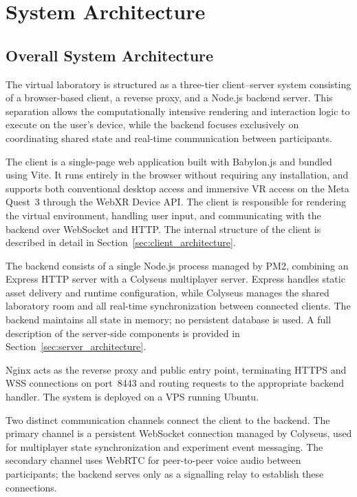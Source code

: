 \chapter{System Architecture}

\section{Overall System Architecture}
\label{sec:overall_architecture}

The virtual laboratory is structured as a three-tier client--server system
consisting of a browser-based client, a reverse proxy, and a Node.js backend
server. This separation allows the computationally intensive rendering and
interaction logic to execute on the user's device, while the backend focuses
exclusively on coordinating shared state and real-time communication between
participants.

The client is a single-page web application built with Babylon.js and bundled
using Vite. It runs entirely in the browser without requiring any installation,
and supports both conventional desktop access and immersive VR access on the
Meta Quest~3 through the WebXR Device API. The client is responsible for
rendering the virtual environment, handling user input, and communicating with
the backend over WebSocket and HTTP. The internal structure of the client is
described in detail in Section~\ref{sec:client_architecture}.

The backend consists of a single Node.js process managed by PM2, combining an
Express HTTP server with a Colyseus multiplayer server. Express handles static
asset delivery and runtime configuration, while Colyseus manages the shared
laboratory room and all real-time synchronization between connected clients.
The backend maintains all state in memory; no persistent database is used. A
full description of the server-side components is provided in
Section~\ref{sec:server_architecture}.

Nginx acts as the reverse proxy and public entry point, terminating HTTPS and
WSS connections on port~8443 and routing requests to the appropriate backend
handler. The system is deployed on a VPS running Ubuntu.

Two distinct communication channels connect the client to the backend. The
primary channel is a persistent WebSocket connection managed by Colyseus,
used for multiplayer state synchronization and experiment event messaging.
The secondary channel uses WebRTC for peer-to-peer voice audio between
participants; the backend serves only as a signalling relay to establish
these connections.

